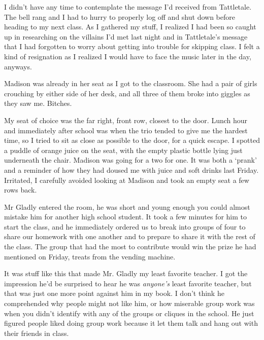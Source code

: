 





I didn't have any time to contemplate the message I'd received from Tattletale.  The bell rang and I had to hurry to properly log off and shut down before heading to my next class.  As I gathered my stuff, I realized I had been so caught up in researching on the villains I'd met last night and in Tattletale's message that I had forgotten to worry about getting into trouble for skipping class.  I felt a kind of resignation as I realized I would have to face the music later in the day, anyways.



Madison was already in her seat as I got to the classroom.  She had a pair of girls crouching by either side of her desk, and all three of them broke into giggles as they saw me.  Bitches.



My seat of choice was the far right, front row, closest to the door.  Lunch hour and immediately after school was when the trio tended to give me the hardest time, so I tried to sit as close as possible to the door, for a quick escape.  I spotted a puddle of orange juice on the seat, with the empty plastic bottle lying just underneath the chair.  Madison was going for a two for one.  It was both a `prank' and a reminder of how they had doused me with juice and soft drinks last Friday.  Irritated, I carefully avoided looking at  Madison and took an empty seat a few rows back.



Mr Gladly entered the room, he was short and young enough you could almost mistake him for another high school student.  It took a few minutes for him to start the class, and he immediately ordered us to break into groups of four to share our homework with one another and to prepare to share it with the rest of the class.  The group that had the most to contribute would win the prize he had mentioned on Friday, treats from the vending machine.



It was stuff like this that made Mr. Gladly my least favorite teacher.  I got the impression he'd be surprised to hear he was \emph{anyone's} least favorite teacher, but that was just one more point against him in my book.  I don't think he comprehended why people might not like him, or how miserable group work was when you didn't identify with any of the groups or cliques in the school.  He just figured people liked doing group work because it let them talk and hang out with their friends in class.



